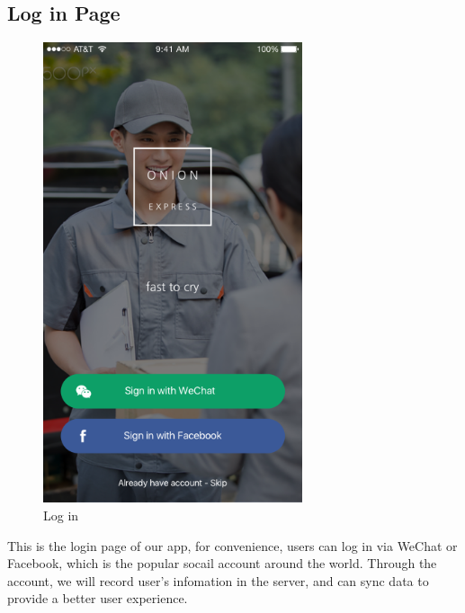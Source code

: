 \documentclass[12pt]{scrreprt}
\begin{document}
\subsection{Log in Page}
\begin{figure}[htbp]
  \centering\includegraphics[width=3in]{DocumentRes/Login.png}
  \caption{Log in}
\end{figure}
This is the login page of our app, for convenience, users can log in via WeChat or
Facebook, which is the popular socail account around the world. Through the
account, we will record user's infomation in the server, and can sync data to
provide a better user experience.
\end{document}
